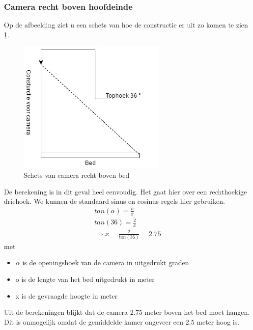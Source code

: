 \subsubsection{Camera recht boven hoofdeinde}
Op de afbeelding ziet u een schets van hoe de constructie er uit zo komen te zien \ref{imgCBB}.
\begin{figure}[hbp]
	\includegraphics[scale=0.7]{CamBovenBed}
	\caption{Schets van camera recht boven bed}
	\label{imgCBB}
\end{figure}
De berekening is in dit geval heel eenvoudig. Het gaat hier over een rechthoekige driehoek. We kunnen de standaard sinus en cosinus regels hier gebruiken.
\begin{gather}
tan(\alpha) =\frac{o}{x}\\
tan(36) = \frac{2}{x} \\
\Rightarrow x = \frac{2}{tan(36)} = 2.75
\end{gather}
met
\begin{itemize}
	\item $\alpha$ is de openingshoek van de camera in uitgedrukt graden
	\item o is de lengte van het bed uitgedrukt in meter
	\item x is de gevraagde hoogte in meter
\end{itemize}

Uit de berekeningen blijkt dat de camera 2.75 meter boven het bed moet hangen. Dit is onmogelijk omdat de gemiddelde kamer ongeveer een 2.5 meter hoog is.

